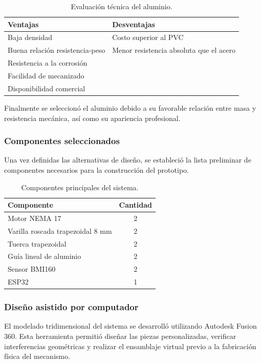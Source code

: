 \begin{table}[H]
\centering
\caption{Evaluación técnica del aluminio.}
\begin{tabularx}{\columnwidth}{|X|X|}
\hline
\rowcolor{green!20}
Ventajas & Desventajas\\
\hline
Baja densidad &
Costo superior al PVC\\
\hline
Buena relación resistencia-peso &
Menor resistencia absoluta que el acero\\
\hline
Resistencia a la corrosión &
\\
\hline
Facilidad de mecanizado &
\\
\hline
Disponibilidad comercial &
\\
\hline
\end{tabularx}
\end{table}

Finalmente se seleccionó el aluminio debido a su favorable relación entre masa y resistencia mecánica, así como su apariencia profesional.

\subsubsection{Componentes seleccionados}

Una vez definidas las alternativas de diseño, se estableció la lista preliminar de componentes necesarios para la construcción del prototipo.

\begin{table}[H]
\centering
\caption{Componentes principales del sistema.}
\begin{tabularx}{\columnwidth}{|X|c|}
\hline
\rowcolor{gray!20}
Componente & Cantidad\\
\hline
Motor NEMA 17 & 2\\
Varilla roscada trapezoidal 8 mm & 2\\
Tuerca trapezoidal & 2\\
Guía lineal de aluminio & 2\\
Sensor BMI160 & 2\\
ESP32 & 1\\
\hline
\end{tabularx}
\end{table}

\subsubsection{Diseño asistido por computador}

El modelado tridimensional del sistema se desarrolló utilizando Autodesk Fusion 360. Esta herramienta permitió diseñar las piezas personalizadas, verificar interferencias geométricas y realizar el ensamblaje virtual previo a la fabricación física del mecanismo.

